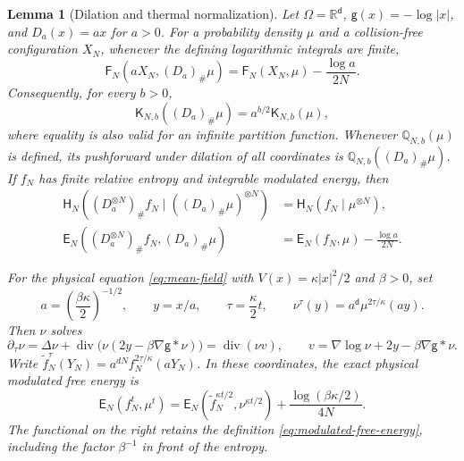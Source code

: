 \documentclass[11pt,reqno]{amsart}
\numberwithin{equation}{section}
\newtheorem{lemma}[lemma]{Lemma}
\theoremstyle{definition}
\theoremstyle{remark}
\newcommand{\R}{\mathbb R}
\newcommand{\g}{\mathsf g}
\renewcommand{\d}{\mathsf d}
\newcommand{\Hr}{\mathsf H}
\newcommand{\Fr}{\mathsf F}
\newcommand{\Er}{\mathsf E}
\newcommand{\K}{\mathsf K}
\newcommand{\Q}{\mathbb Q}
\newcommand{\diver}{\operatorname{div}}
\begin{document}
\begin{lemma}[Dilation and thermal normalization]\label{lem:thermal-normalization}
Let $\Omega=\R^\d$, $\g(x)=-\log|x|$, and $D_a(x)=ax$ for $a>0$. For a probability density $\mu$ and a collision-free configuration $X_N$, whenever the defining logarithmic integrals are finite,
\begin{equation}\label{eq:dilation-energy}
 \Fr_N(aX_N,(D_a)_\#\mu)=\Fr_N(X_N,\mu)-\frac{\log a}{2N}.
\end{equation}
Consequently, for every $b>0$,
\begin{equation}\label{eq:dilation-partition}
 \K_{N,b}((D_a)_\#\mu)=a^{b/2}\K_{N,b}(\mu),
\end{equation}
where equality is also valid for an infinite partition function. Whenever $\Q_{N,b}(\mu)$ is defined, its pushforward under dilation of all coordinates is $\Q_{N,b}((D_a)_\#\mu)$. If $f_N$ has finite relative entropy and integrable modulated energy, then
\begin{align}
 \Hr_N((D_a^{\otimes N})_\# f_N\mid((D_a)_\#\mu)^{\otimes N})
 &=\Hr_N(f_N\mid\mu^{\otimes N}),\label{eq:dilation-entropy}\\
 \Er_N((D_a^{\otimes N})_\# f_N,(D_a)_\#\mu)
 &=\Er_N(f_N,\mu)-\frac{\log a}{2N}.\label{eq:dilation-free-energy}
\end{align}

For the physical equation \eqref{eq:mean-field} with $V(x)=\kappa|x|^2/2$ and $\beta>0$, set
\begin{equation}\label{eq:thermal-coordinates}
 a=\left(\frac{\beta\kappa}{2}\right)^{-1/2},\qquad
 y=x/a,\qquad \tau=\frac\kappa2t,\qquad
 \nu^\tau(y)=a^\d\mu^{2\tau/\kappa}(ay).
\end{equation}
Then $\nu$ solves
\begin{equation}\label{eq:thermal-equation}
 \partial_\tau\nu=\Delta\nu+
 \diver\bigl(\nu(2y-\beta\nabla\g*\nu)\bigr)=\diver(\nu v),
 \qquad v=\nabla\log\nu+2y-\beta\nabla\g*\nu.
\end{equation}
Write $\widetilde f_N^\tau(Y_N)=a^{dN}f_N^{2\tau/\kappa}(aY_N)$. In these coordinates, the exact physical modulated free energy is
\begin{equation}\label{eq:physical-thermal-energy}
 \Er_N(f_N^t,\mu^t)
 =\Er_N(\widetilde f_N^{\kappa t/2},\nu^{\kappa t/2})
   +\frac{\log(\beta\kappa/2)}{4N}.
\end{equation}
The functional on the right retains the definition \eqref{eq:modulated-free-energy}, including the factor $\beta^{-1}$ in front of the entropy.
\end{lemma}
\end{document}
